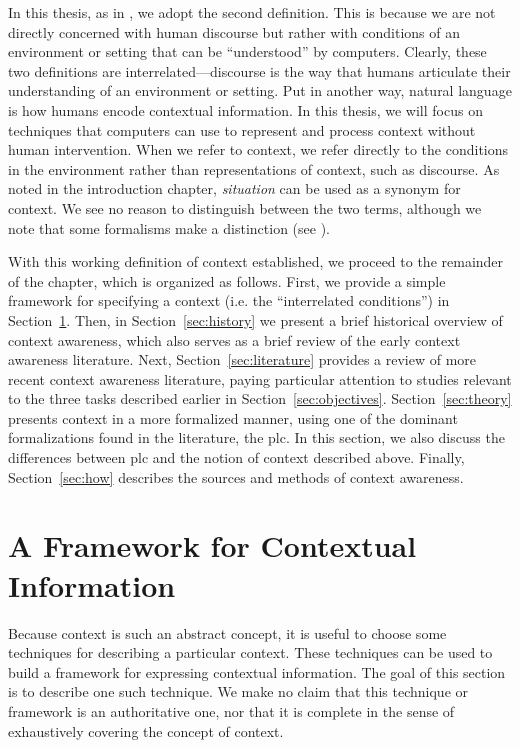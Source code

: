 In this thesis, as in \cite{chen_geospatial_2014}, we adopt the second definition. This is because we are not directly concerned with human discourse but rather with conditions of an environment or setting that can be ``understood'' by computers. Clearly, these two definitions are interrelated---discourse is the way that humans articulate their understanding of an environment or setting. Put in another way, natural language is how humans encode contextual information. In this thesis, we will focus on techniques that computers can use to represent and process context without human intervention. When we refer to context, we refer directly to the conditions in the environment rather than representations of context, such as discourse. As noted in the introduction chapter, \emph{situation} can be used as a synonym for context. We see no reason to distinguish between the two terms, although we note that some formalisms make a distinction (see \cite{akman1996steps}).

With this working definition of context established, we proceed to the remainder of the chapter, which is organized as follows. First, we provide a simple framework for specifying a context (i.e. the ``interrelated conditions'') in Section~\ref{sec:framework}. Then, in Section~\ref{sec:history} we present a brief historical overview of context awareness, which also serves as a brief review of the early context awareness literature. Next, Section~\ref{sec:literature} provides a review of more recent context awareness literature, paying particular attention to studies relevant to the three tasks described earlier in Section~\ref{sec:objectives}. Section~\ref{sec:theory} presents context in a more formalized manner, using one of the dominant formalizations found in the literature, the \gls{plc}. In this section, we also discuss the differences between \gls{plc} and the notion of context described above. Finally, Section~\ref{sec:how} describes the sources and methods of context awareness.

\section{A Framework for Contextual Information}
\label{sec:framework}

Because context is such an abstract concept, it is useful to choose some techniques for describing a particular context. These techniques can be used to build a framework for expressing contextual information. The goal of this section is to describe one such technique. We make no claim that this technique or framework is an authoritative one, nor that it is complete in the sense of exhaustively covering the concept of context.

